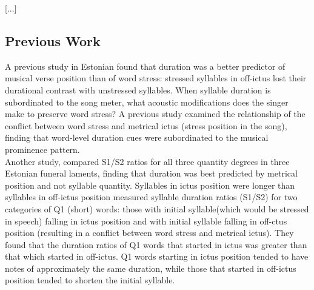 \documentclass[11pt]{article}
\begin{document}
 
[...]
\subsection*{Previous Work}

  A previous study in Estonian \cite{rossTradeoffQuantityStress1996} found that duration was a better predictor of musical verse position than of word stress: stressed syllables in off-ictus lost their durational contrast with unstressed syllables. When syllable duration is subordinated to the song meter, what acoustic modifications does the singer make to preserve word stress?
A previous study \cite{rossTradeoffQuantityStress1996} examined the relationship of the conflict between word stress and metrical ictus (stress position in the song), finding that word-level duration cues were subordinated to the musical prominence pattern. \\

 Another study,
 \cite{rossLostProsodicOppositions1994} compared S1/S2 ratios for all three quantity degrees in three Estonian funeral laments, finding that duration was best predicted by metrical position and not syllable quantity. 
 \cite{rossTradeoffQuantityStress1996}
 Syllables in ictus position were longer than syllables in off-ictus position
 measured syllable duration ratios (S1/S2) for two categories of Q1 (short) words: those with initial syllable(which would be stressed in speech) falling in ictus position and with initial syllable falling in off-ctus position (resulting in a conflict between word stress and metrical ictus). They found that the duration ratios of Q1 words that started in ictus was greater than that which started in off-ictus. Q1 words starting in ictus position tended to have notes of approximately the same duration, while those that started in off-ictus position tended to shorten the initial syllable.  \\
\end{document}
